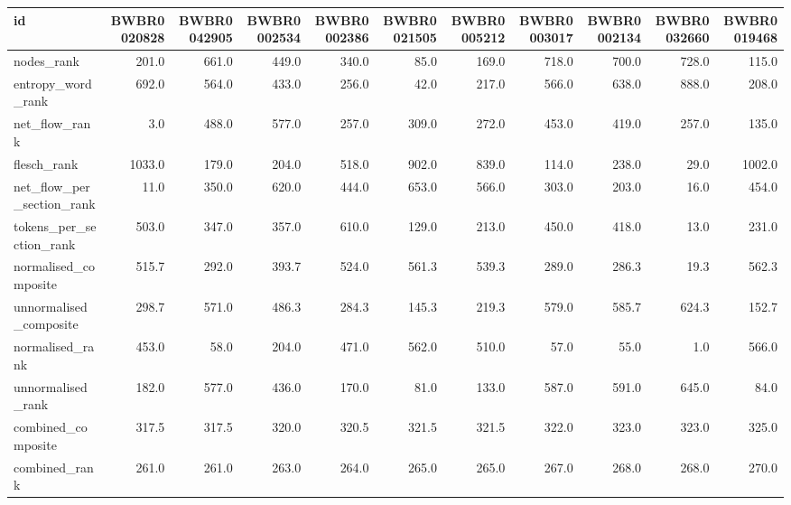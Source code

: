 \begin{tabular}{lrrrrrrrrrr}
\toprule
id & BWBR0020828 & BWBR0042905 & BWBR0002534 & BWBR0002386 & BWBR0021505 & BWBR0005212 & BWBR0003017 & BWBR0002134 & BWBR0032660 & BWBR0019468 \\
\midrule
nodes\_rank & 201.0 & 661.0 & 449.0 & 340.0 & 85.0 & 169.0 & 718.0 & 700.0 & 728.0 & 115.0 \\
\cline{1-11}
entropy\_word\_rank & 692.0 & 564.0 & 433.0 & 256.0 & 42.0 & 217.0 & 566.0 & 638.0 & 888.0 & 208.0 \\
\cline{1-11}
net\_flow\_rank & 3.0 & 488.0 & 577.0 & 257.0 & 309.0 & 272.0 & 453.0 & 419.0 & 257.0 & 135.0 \\
\cline{1-11}
flesch\_rank & 1033.0 & 179.0 & 204.0 & 518.0 & 902.0 & 839.0 & 114.0 & 238.0 & 29.0 & 1002.0 \\
\cline{1-11}
net\_flow\_per\_section\_rank & 11.0 & 350.0 & 620.0 & 444.0 & 653.0 & 566.0 & 303.0 & 203.0 & 16.0 & 454.0 \\
\cline{1-11}
tokens\_per\_section\_rank & 503.0 & 347.0 & 357.0 & 610.0 & 129.0 & 213.0 & 450.0 & 418.0 & 13.0 & 231.0 \\
\cline{1-11}
normalised\_composite & 515.7 & 292.0 & 393.7 & 524.0 & 561.3 & 539.3 & 289.0 & 286.3 & 19.3 & 562.3 \\
\cline{1-11}
unnormalised\_composite & 298.7 & 571.0 & 486.3 & 284.3 & 145.3 & 219.3 & 579.0 & 585.7 & 624.3 & 152.7 \\
\cline{1-11}
normalised\_rank & 453.0 & 58.0 & 204.0 & 471.0 & 562.0 & 510.0 & 57.0 & 55.0 & 1.0 & 566.0 \\
\cline{1-11}
unnormalised\_rank & 182.0 & 577.0 & 436.0 & 170.0 & 81.0 & 133.0 & 587.0 & 591.0 & 645.0 & 84.0 \\
\cline{1-11}
combined\_composite & 317.5 & 317.5 & 320.0 & 320.5 & 321.5 & 321.5 & 322.0 & 323.0 & 323.0 & 325.0 \\
\cline{1-11}
combined\_rank & 261.0 & 261.0 & 263.0 & 264.0 & 265.0 & 265.0 & 267.0 & 268.0 & 268.0 & 270.0 \\
\cline{1-11}
\bottomrule
\end{tabular}
